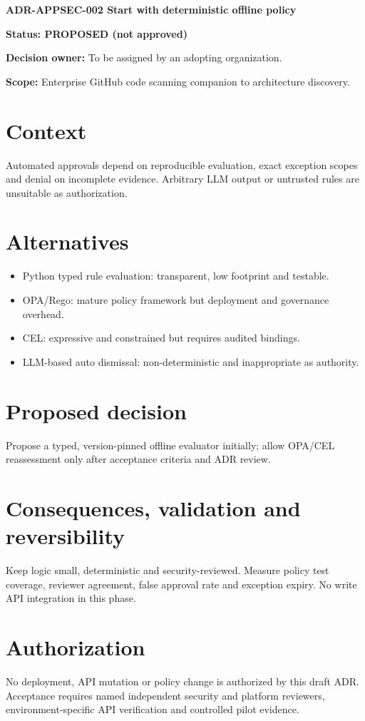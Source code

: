 \documentclass[11pt,letterpaper]{article}
\begin{document}
{\LARGE\bfseries ADR-APPSEC-002 Start with deterministic offline policy}\par
\textbf{Status: PROPOSED (not approved)}\par
\textbf{Decision owner:} To be assigned by an adopting organization.\par
\textbf{Scope:} Enterprise GitHub code scanning companion to architecture discovery.
\section{Context}
Automated approvals depend on reproducible evaluation, exact exception scopes and denial on incomplete evidence. Arbitrary LLM output or untrusted rules are unsuitable as authorization.
\section{Alternatives}
\begin{itemize}
\item Python typed rule evaluation: transparent, low footprint and testable.
\item OPA/Rego: mature policy framework but deployment and governance overhead.
\item CEL: expressive and constrained but requires audited bindings.
\item LLM-based auto dismissal: non-deterministic and inappropriate as authority.
\end{itemize}
\section{Proposed decision}
Propose a typed, version-pinned offline evaluator initially; allow OPA/CEL reassessment only after acceptance criteria and ADR review.
\section{Consequences, validation and reversibility}
Keep logic small, deterministic and security-reviewed. Measure policy test coverage, reviewer agreement, false approval rate and exception expiry. No write API integration in this phase.
\section{Authorization}
No deployment, API mutation or policy change is authorized by this draft ADR. Acceptance requires named independent security and platform reviewers, environment-specific API verification and controlled pilot evidence.
\end{document}
